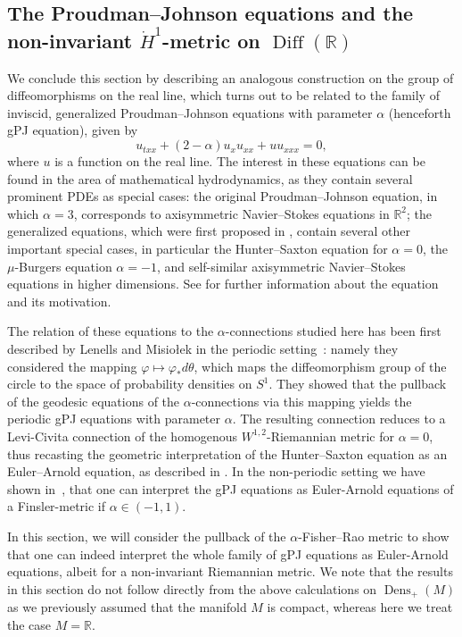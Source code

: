 \documentclass[11pt,reqno]{amsart}
\theoremstyle{definition}
\newcommand{\R}{\mathbb R}
\newcommand{\Dens}{\operatorname{Dens}_+(M)}
\newcommand{\DiffR}{\operatorname{Diff}(\mathbb R)}
\begin{document}
\subsection{The Proudman--Johnson equations and the non-invariant $\dot H^1$-metric on $\DiffR$}\label{sec:PJnonperiodic}
We conclude this section by describing an analogous construction on the group of diffeomorphisms on the real line, which turns out to be related to the family of inviscid, generalized Proudman--Johnson equations with parameter $\alpha$ (henceforth gPJ equation), given by
\begin{equation*}\label{eq:pj}
u_{txx} + (2-\alpha)u_xu_{xx} +uu_{xxx} = 0, 
\end{equation*}
where $u$ is a function on the real line. The interest in these equations can be found in the area of mathematical hydrodynamics, as they contain several prominent PDEs as special cases: the original Proudman--Johnson equation, in which $\alpha = 3$, corresponds to axisymmetric Navier--Stokes equations in $\R^2$; the generalized equations, which were first proposed in \cite{okamoto2000some}, contain several other important special cases, in particular the Hunter--Saxton equation for $\alpha=0$, the $\mu$-Burgers equation $\alpha=-1$, and self-similar axisymmetric Navier--Stokes equations in higher dimensions.
See \cite{Wun11} for further information about the equation and its motivation.

The relation of these equations to the $\alpha$-connections studied here has been first described by Lenells and Misio{\l}ek in the periodic setting~\cite{lenells2014amari}: namely they considered the mapping $\varphi\mapsto \varphi_*d\theta$, which maps the diffeomorphism group of the circle to the space of probability densities on $S^1$. They showed that the pullback of the geodesic equations of the $\alpha$-connections via this mapping yields the periodic gPJ equations with parameter $\alpha$. 
The resulting connection reduces to a Levi-Civita connection of the homogenous $W^{1,2}$-Riemannian metric for $\alpha=0$, %
thus recasting the geometric interpretation of the Hunter--Saxton equation as an Euler--Arnold equation, as described in \cite{lenells2007hunter}. In the non-periodic setting we have shown in~\cite{bauer2022geometric}, that one can interpret the gPJ equations as Euler-Arnold equations of a Finsler-metric if $\alpha\in (-1,1)$. 


In this section, we will consider the pullback of the $\alpha$-Fisher--Rao metric to show that one can indeed interpret the whole family of gPJ equations as Euler-Arnold equations, albeit for a non-invariant Riemannian metric. 
We note that the results in this section do not follow directly from the above calculations on $\Dens$ as we previously assumed that the manifold $M$ is compact, whereas here we treat the case $M=\mathbb R$.
\end{document}

